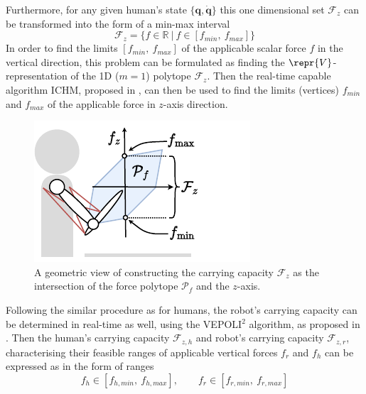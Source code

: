 Furthermore, for any given human's state $\{\bm{q},\dot{\bm{q}}\}$ this one dimensional set $\mathcal{F}_z$ can be transformed into the form of a min-max interval
\begin{equation}
    \mathcal{F}_z = \{ f \in \mathbb{R} ~|~ f \in[{f}_{min}, ~{f}_{max}]\}
\end{equation}
In order to find the limits $[f_{min},~f_{max}]$ of the applicable scalar force $f$ in the vertical direction, this problem can be formulated as finding the $\repr{V}$-representation of the 1D ($m=1$) polytope $\mathcal{F}_z$. Then the real-time capable algorithm ICHM, proposed in , can then be used to find the limits (vertices) $f_{min}$ and $f_{max}$ of the applicable force in $z$-axis direction.  


\begin{figure}
    \centering
    \includegraphics[width=\linewidth]{Papers/images/carrying_capacity_human.pdf}
    \caption{A geometric view of constructing the carrying capacity $\mathcal{F}_z$ as the intersection of the force polytope $\mathcal{P}_f$ and the $z$-axis.}
    \label{fig:carrying_cap_human}
\end{figure}
Following the similar procedure as for humans, the robot's carrying capacity can be determined in real-time as well, using the VEPOLI$^2$ algorithm, as proposed in . Then the human's carrying capacity $\mathcal{F}_{z,h}$ and robot's carrying capacity $\mathcal{F}_{z,r}$, characterising their feasible ranges of applicable vertical forces $f_r$ and $f_h$ can be expressed as in the form of ranges
\begin{equation}
    f_{h}\in [f_{h,min}, ~f_{h,max}], \qquad f_{r} \in [f_{r,min}, ~f_{r,max} ]
    \label{eq:human_robot_carrying_capacity}
\end{equation}

